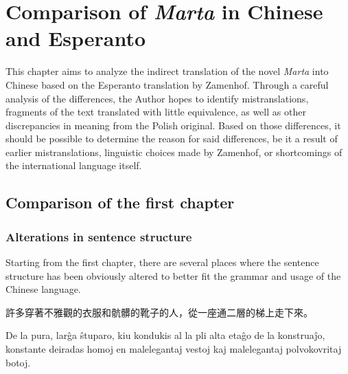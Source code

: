 \chapter{Comparison of \textit{Marta} in Chinese and Esperanto}

This chapter aims to analyze the indirect translation of the novel \textit{Marta} into Chinese based on the Esperanto translation by Zamenhof.
Through a careful analysis of the differences, the Author hopes to identify mistranslations, fragments of the text translated with little equivalence, as well as other discrepancies in meaning from the Polish original.
Based on those differences, it should be possible to determine the reason for said differences, be it a result of earlier mistranslations, linguistic choices made by Zamenhof, or shortcomings of the international language itself.

\section{Comparison of the first chapter}

\subsection{Alterations in sentence structure}

Starting from the first chapter, there are several places where the sentence structure has been obviously altered to better fit the grammar and usage of the Chinese language.

許多穿著不雅觀的衣服和骯髒的靴子的人，從一座通二層的梯上走下來。

\begin{displayquote}
De la pura, larĝa ŝtuparo, kiu kondukis al la pli alta etaĝo de la konstruaĵo, konstante deiradas homoj en malelegantaj vestoj kaj malelegantaj polvokovritaj botoj.
\end{displayquote}
